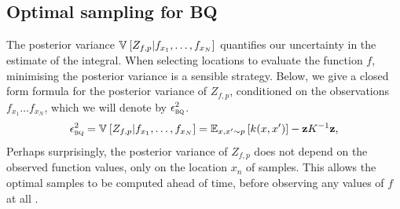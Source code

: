 \documentclass[]{article}
\begin{document}
\subsection{Optimal sampling for BQ}

The posterior variance $\mathbb{V}_{} \left[ {Z_{f,p}|f_{x_1}, \dots, f_{x_N}} \right]$ quantifies our uncertainty in the estimate of the integral. When selecting locations to evaluate the function $f$, minimising the posterior variance is a sensible strategy. Below, we give a closed form formula for the posterior variance of $Z_{f,p}$, conditioned on the observations $f_{x_1} \dots f_{x_N}$, which we will denote by $\epsilon^2_{{\textsc{bq}}{}}$.
\begin{align}
\epsilon^{2}_{{\textsc{bq}}{}} = \mathbb{V}_{} \left[ {Z_{f,p}|f_{x_1}, \dots, f_{x_N}} \right] 
  = \mathbb{E}_{{x}, {x}' \sim p} \left[ {k({x}, {x}')} \right] - {\bf{z}} K^{-1} {\bf{z}}\mbox{,}
\label{eq:marg_var_symbolic}
\end{align}
Perhaps surprisingly, the posterior variance of $Z_{f,p}$ does not depend on the observed function values, only on the location $x_n$ of samples.  This allows the optimal samples to be computed ahead of time, before observing any values of $f$ at all \citep{minka2000dqr}.
\end{document}
